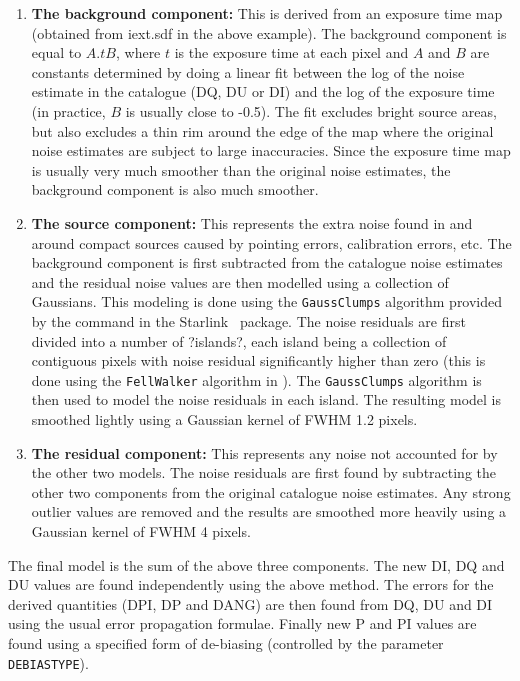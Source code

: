 \begin{enumerate}
\item {\bf The background component:} This is derived from an exposure time map  (obtained from
iext.sdf in the above example). The background component is equal to $A.tB$, where $t$ is 
the exposure time at each pixel and $A$ and $B$ are constants determined by doing a linear fit 
between
the log of the noise estimate in the catalogue (DQ, DU or DI) and the log of the exposure time
(in practice, $B$ is usually close to -0.5). The fit excludes bright source areas, but also excludes a
thin rim around the edge of the map where the original noise estimates are subject to large
inaccuracies. Since the exposure time map is usually very much smoother than the original
noise estimates, the background component is also much smoother.
\item {\bf The source component:} This represents the extra noise found in and around compact sources caused by pointing errors, calibration errors, etc. The background component is first subtracted from the catalogue noise estimates and the residual noise values are then modelled using a collection of Gaussians. This modeling is done using the \texttt{GaussClumps} algorithm provided by the  command in the Starlink \cupid\ package. The noise residuals are first divided into a number of ?islands?, each island being a collection of contiguous pixels with  noise residual significantly higher than zero (this is done using the \texttt{FellWalker} algorithm in \cupid). The \texttt{GaussClumps} algorithm is then used to model the noise residuals in each island. The resulting model is smoothed lightly using a Gaussian kernel of FWHM 1.2 pixels.
\item {\bf The residual component:} This represents any noise not accounted for by the other two models. The noise residuals are first found by subtracting the other two components from the original catalogue noise estimates. Any strong outlier values are removed and the results are smoothed more heavily using a Gaussian kernel of FWHM 4 pixels.
\end{enumerate}

The final model is the sum of the above three components. The new DI, DQ and DU values are found independently using the above method. The errors for the derived quantities (DPI, DP and DANG) are then found from DQ, DU and DI using the usual error propagation formulae. Finally new P and PI values are found using a specified form of de-biasing (controlled by the parameter \texttt{DEBIASTYPE}).



